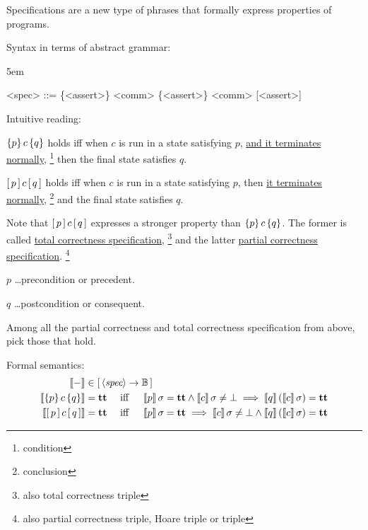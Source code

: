 \begin{enumcirc}
	\item
	Specifications are a new type of phrases that formally express properties of
	programs.
	\item
	Syntax in terms of abstract grammar:
	\begin{center}
		\begin{minipage}{0.5\textwidth}
			\grammarindent5em
			\begin{grammar}
				<spec> ::= \{<assert>\} <comm> \{<assert>\}
				\alt [<assert>] <comm> [<assert>]
			\end{grammar}
		\end{minipage}
	\end{center}
	\begin{exampletab}
		\todo
	\end{exampletab}
	\item
	Intuitive reading:
	\begin{enumrm}
		\item
		$\left\{ p \right\} c \left\{ q \right\}$ holds iff when $c$ is run in a state satisfying $p$,
		\ul{and it terminates normally}, \footnote{condition} then the final state satisfies $q$.
		\item
		$\left[ \, p \, \right] c \left[ \, q \, \right]$ holds iff when $c$ is run in a state satisfying $p$,
		then \ul{it terminates normally}, \footnote{conclusion} and the final state satisfies $q$.
	\end{enumrm}
	Note that $\left[ \, p \, \right] c \left[ \, q \, \right]$ expresses a stronger property than
	$\left\{ p \right\} c \left\{ q \right\}$.
	The former is called \ul{total correctness specification}, \footnote{also total
		correctness triple} and the latter \ul{partial correctness specification}.
	\footnote{also partial correctness triple, Hoare triple or triple}

	$p$ \dots precondition or precedent.

	$q$ \dots postcondition or consequent.

	\begin{exercise}
		Among all the partial correctness and total correctness specification from
		above, pick those that hold.
	\end{exercise}
	\item
	Formal semantics:
	\begin{align*}
		\left\llbracket - \right\rrbracket                           & \in \left[ \, \left\langle \textit{spec} \right\rangle \to \mathbb{B} \, \right] \\
		\left\llbracket \left\{ p \right\} c \left\{ q \right\} \right\rrbracket     & = \textbf{tt} \quad \textrm{ iff } \quad
		\left\llbracket p \right\rrbracket \sigma = \textbf{tt} \wedge \left\llbracket c \right\rrbracket \sigma \neq \bot \implies
		\left\llbracket q \right\rrbracket \left( \left\llbracket c \right\rrbracket \sigma \right) = \textbf{tt}                           \\
		\left\llbracket \left[ \, p \, \right] c \left[ \, q \, \right] \right\rrbracket & = \textbf{tt} \quad \textrm{ iff } \quad
		\left\llbracket p \right\rrbracket \sigma = \textbf{tt} \implies \left\llbracket c \right\rrbracket \sigma \neq \bot \wedge
		\left\llbracket q \right\rrbracket \left( \left\llbracket c \right\rrbracket \sigma \right) = \textbf{tt}
	\end{align*}
\end{enumcirc}

